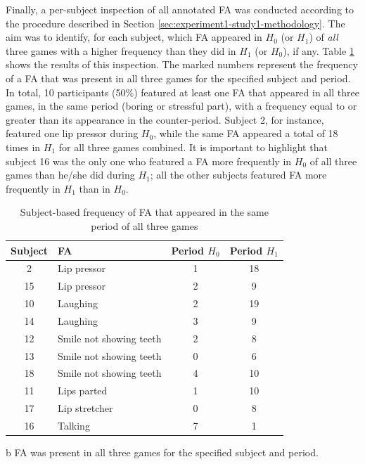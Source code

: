 Finally, a per-subject inspection of all annotated FA was conducted according to the procedure described in Section \ref{sec:experiment1-study1-methodology}. The aim was to identify, for each subject, which FA appeared in $H_0$ (or $H_1$) of \emph{all} three games with a higher frequency than they did in $H_1$ (or $H_0$), if any. Table \ref{table:individual} shows the results of this inspection. The marked numbers represent the frequency of a FA that was present in all three games for the specified subject and period. In total, 10 participants (50\%) featured at least one FA that appeared in all three games, in the same period (boring or stressful part), with a frequency equal to or greater than its appearance in the counter-period. Subject 2, for instance, featured one lip pressor during $H_0$, while the same FA appeared a total of 18 times in $H_1$ for all three games combined. It is important to highlight that subject 16 was the only one who featured a FA more frequently in $H_0$ of all three games than he/she did during $H_1$; all the other subjects featured FA more frequently in $H_1$ than in $H_0$.

\begin{table}[!h]
\caption{Subject-based frequency of FA that appeared in the same period of all three games}
\label{table:individual}
\centering
\begin{threeparttable}
\begin{tabular}{cp{.4\linewidth}cc}
\toprule%
\textbf{Subject} & \textbf{FA} & \textbf{Period $H_0$} & \textbf{Period $H_1$} \\
\midrule%
2 & Lip pressor & 1 & 18\tnote{b} \\
15 & Lip pressor & 2 & 9\tnote{b} \\
10 & Laughing & 2 & 19\tnote{b} \\
14 & Laughing & 3 & 9\tnote{b} \\
12 & Smile not showing teeth & 2 & 8\tnote{b} \\
13 & Smile not showing teeth & 0 & 6\tnote{b} \\
18 & Smile not showing teeth & 4 & 10\tnote{b} \\
11 & Lips parted & 1 & 10\tnote{b} \\
17 & Lip stretcher & 0 & 8\tnote{b} \\
16 & Talking & 7\tnote{b} & 1 \\
\bottomrule
\end{tabular}
\begin{tablenotes}
\small
\item[b]{FA was present in all three games for the specified subject and period.}
\end{tablenotes}
\end{threeparttable}
\end{table}

